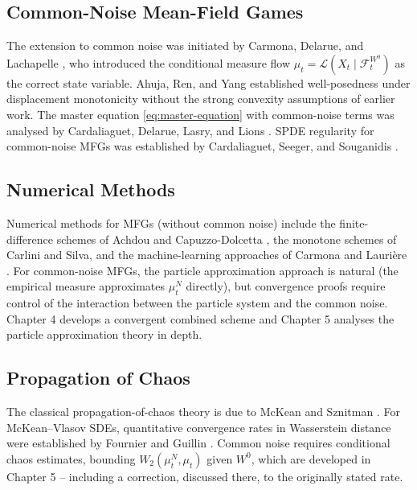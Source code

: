 \subsection{Common-Noise Mean-Field Games}

The extension to common noise was initiated by Carmona, Delarue, and Lachapelle
\citep{carmona2013probabilistic}, who introduced the conditional measure flow
$\mu_t = \mathcal{L}(X_t \mid \mathcal{F}_t^{W^0})$ as the correct state variable.
Ahuja, Ren, and Yang \citep{ahujarenyang2019} established well-posedness under
displacement monotonicity without the strong convexity assumptions of earlier work.
The master equation \eqref{eq:master-equation} with common-noise terms was
analysed by Cardaliaguet, Delarue, Lasry, and Lions \citep{cardaliaguetetal2019}.
SPDE regularity for common-noise MFGs was established by Cardaliaguet, Seeger, and
Souganidis \citep{cardaliaguetseegersouganidis2025}.

\subsection{Numerical Methods}

Numerical methods for MFGs (without common noise) include the finite-difference
schemes of Achdou and Capuzzo-Dolcetta \citep{achdoucapuzzo2010}, the monotone
schemes of Carlini and Silva, and the machine-learning approaches of Carmona and
Lauri\`{e}re \citep{carmonalauriere2022}. For common-noise MFGs, the particle
approximation approach is natural (the empirical measure approximates $\mu_t^N$
directly), but convergence proofs require control of the interaction between the
particle system and the common noise. Chapter 4 develops a convergent combined
scheme and Chapter 5 analyses the particle approximation theory in depth.

\subsection{Propagation of Chaos}

The classical propagation-of-chaos theory is due to McKean \citep{mckean1966}
and Sznitman \citep{sznitman1991}. For McKean--Vlasov SDEs, quantitative
convergence rates in Wasserstein distance were established by Fournier and Guillin
\citep{fournierguillin2015}.
Common noise requires conditional
chaos estimates, bounding $W_2(\mu_t^N, \mu_t)$ given $W^0$, which are
developed in Chapter 5 -- including a correction, discussed there, to the
originally stated rate.

